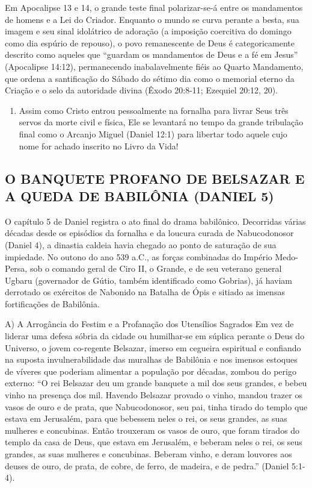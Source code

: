 Em Apocalipse 13 e 14, o grande teste final polarizar-se-á entre os mandamentos de homens e a Lei do Criador. Enquanto o mundo se curva perante a besta, sua imagem e seu sinal idolátrico de adoração (a imposição coercitiva do domingo como dia espúrio de repouso), o povo remanescente de Deus é categoricamente descrito como aqueles que ``guardam os mandamentos de Deus e a fé em Jesus'' (Apocalipse 14:12), permanecendo inabalavelmente fiéis ao Quarto Mandamento, que ordena a santificação do Sábado do sétimo dia como o memorial eterno da Criação e o selo da autoridade divina (Êxodo 20:8-11; Ezequiel 20:12, 20).
\begin{enumerate}
  \item Assim como Cristo entrou pessoalmente na fornalha para livrar Seus três servos da morte civil e física, Ele se levantará no tempo da grande tribulação final como o Arcanjo Miguel (Daniel 12:1) para libertar todo aquele cujo nome for achado inscrito no Livro da Vida!
\end{enumerate}




\subsection{O BANQUETE PROFANO DE BELSAZAR E A QUEDA DE BABILÔNIA (DANIEL 5)}


O capítulo 5 de Daniel registra o ato final do drama babilônico. Decorridas várias décadas desde os episódios da fornalha e da loucura curada de Nabucodonosor (Daniel 4), a dinastia caldeia havia chegado ao ponto de saturação de sua impiedade. No outono do ano 539 a.C., as forças combinadas do Império Medo-Persa, sob o comando geral de Ciro II, o Grande, e de seu veterano general Ugbaru (governador de Gútio, também identificado como Gobrias), já haviam derrotado os exércitos de Nabonido na Batalha de Ópis e sitiado as imensas fortificações de Babilônia.

A) A Arrogância do Festim e a Profanação dos Utensílios Sagrados
Em vez de liderar uma defesa sóbria da cidade ou humilhar-se em súplica perante o Deus do Universo, o jovem co-regente Belsazar, imerso em cegueira espiritual e confiando na suposta invulnerabilidade das muralhas de Babilônia e nos imensos estoques de víveres que poderiam alimentar a população por décadas, zombou do perigo externo:
``O rei Belsazar deu um grande banquete a mil dos seus grandes, e bebeu vinho na presença dos mil. Havendo Belsazar provado o vinho, mandou trazer os vasos de ouro e de prata, que Nabucodonosor, seu pai, tinha tirado do templo que estava em Jerusalém, para que bebessem neles o rei, os seus grandes, as suas mulheres e concubinas. Então trouxeram os vasos de ouro, que foram tirados do templo da casa de Deus, que estava em Jerusalém, e beberam neles o rei, os seus grandes, as suas mulheres e concubinas. Beberam vinho, e deram louvores aos deuses de ouro, de prata, de cobre, de ferro, de madeira, e de pedra.'' (Daniel 5:1-4).

